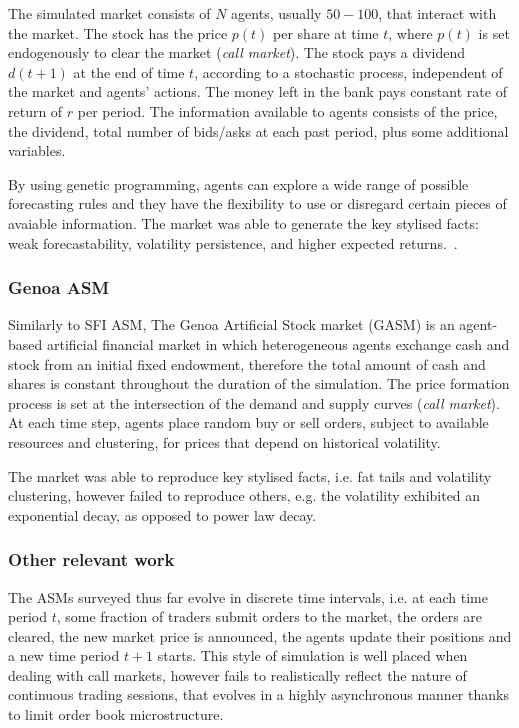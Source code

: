 The simulated market consists of $N$ agents, usually $50-100$, that interact with the market. The stock has the price $p(t)$ per share at time $t$, where $p(t)$ is set endogenously to clear the market (\textit{call market}). The stock pays a dividend $d(t+1)$ at the end of time $t$, according to a stochastic process, independent of the market and agents' actions. The money left in the bank pays constant rate of return of $r$ per period. The information available to agents consists of the price, the dividend, total number of bids/asks at each past period, plus some additional variables. 

By using genetic programming, agents can explore a wide range of possible forecasting rules and they have the flexibility to use or disregard certain pieces of avaiable information. The market was able to generate the key stylised facts: weak forecastability, volatility persistence, and higher expected returns.~\cite{Lebaron99}. 

\subsubsection{Genoa ASM~\citep{Raberto2001}}
Similarly to SFI ASM, The Genoa Artificial Stock market (GASM) is an agent-based artificial financial market in which heterogeneous agents exchange cash and stock from an initial fixed endowment, therefore the total amount of cash and shares is constant throughout the duration of the simulation. The price formation process is set at the intersection of the demand and supply curves (\textit{call market}). At each time step, agents place random buy or sell orders, subject to available resources and clustering, for prices that depend on historical volatility.

The market was able to reproduce key stylised facts, i.e. fat tails and volatility clustering, however failed to reproduce others, e.g. the volatility exhibited an exponential decay, as opposed to power law decay.

\subsubsection{Other relevant work}
The ASMs surveyed thus far evolve in discrete time intervals, i.e. at each time period $t$, some fraction of traders submit orders to the market, the orders are cleared, the new market price is announced, the agents update their positions and a new time period $t+1$ starts. This style of simulation is well placed when dealing with call markets, however fails to realistically reflect the nature of continuous trading sessions, that evolves in a highly asynchronous manner thanks to limit order book microstructure.  

